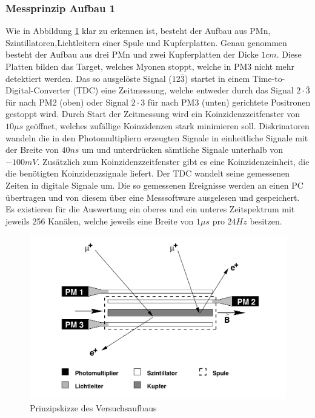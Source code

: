         \subsubsection{Messprinzip Aufbau 1}
            Wie in Abbildung \ref{prinzip} klar zu erkennen ist, besteht der Aufbau aus PMn, Szintillatoren,Lichtleitern einer Spule und Kupferplatten. Genau genommen besteht der Aufbau aus drei PMn und zwei Kupferplatten der Dicke $1\unit{cm}$. Diese Platten bilden das Target, welches Myonen stoppt, welche in PM3 nicht mehr detektiert werden. Das so ausgelöste Signal ($12\overline{3}$) startet in einem Time-to-Digital-Converter (TDC) eine Zeitmessung, welche entweder durch das Signal $2\cdot\overline 3$ für nach PM2 (oben) oder Signal $\overline 2 \cdot 3$ für nach PM3 (unten) gerichtete Positronen gestoppt wird. Durch Start der Zeitmessung wird ein Koinzidenzzeitfenster von $10\unit{\mu s}$ geöffnet, welches zufällige Koinzidenzen stark minimieren soll. Diskrinatoren wandeln die in den Photomultipliern erzeugten Signale in einheitliche Signale mit der Breite von $40\unit{ns}$ um und unterdrücken sämtliche Signale unterhalb von $-100\unit{mV}$.
            Zusätzlich zum Koinzidenzzeitfenster gibt es eine Koinzidenzeinheit, die die benötigten Koinzidenzsignale liefert. Der TDC wandelt seine gemessenen Zeiten in digitale Signale um. Die so gemessenen Ereignisse werden an einen PC übertragen und von diesem über eine Messsoftware ausgelesen und gespeichert. Es existieren für die Auswertung ein oberes und ein unteres Zeitspektrum mit jeweils 256 Kanälen, welche jeweils eine Breite von $1\unit{\mu s}$ pro $24Hz$ besitzen. 
            \begin{figure}
                \centering \includegraphics[scale=1.2]{pic/aufbau.png}
                \caption{\cite{pm} Prinzipskizze des Versuchsaufbaus}
                \label{prinzip}
            \end{figure}
    
